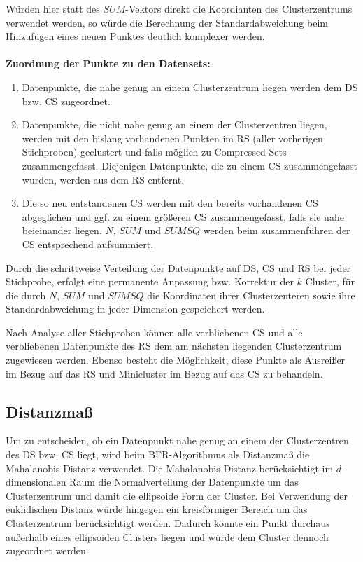 \documentclass[a4paper,12pt,twoside]{article}
\begin{document}
Würden hier statt des $ SUM $-Vektors direkt die Koordianten des Clusterzentrums verwendet werden, so würde die Berechnung der Standardabweichung beim Hinzufügen eines neuen Punktes deutlich komplexer werden.
\\
\\
\noindent
\textbf{Zuordnung der Punkte zu den Datensets:}
\begin{enumerate}
	\item Datenpunkte, die nahe genug an einem Clusterzentrum liegen werden dem DS bzw. CS zugeordnet.
	\item Datenpunkte, die nicht nahe genug an einem der Clusterzentren liegen, werden mit den bislang vorhandenen Punkten im RS (aller vorherigen Stichproben) geclustert und falls möglich zu Compressed Sets zusammengefasst. Diejenigen Datenpunkte, die zu einem CS zusammengefasst wurden, werden aus dem RS entfernt. 
	\item Die so neu entstandenen CS werden mit den bereits vorhandenen CS abgeglichen und ggf. zu einem größeren CS zusammengefasst, falls sie nahe beieinander liegen. $ N $, $ SUM $ und $ SUMSQ $ werden beim zusammenführen der CS entsprechend aufsummiert.
\end{enumerate}	
	
Durch die schrittweise Verteilung der Datenpunkte auf DS, CS und RS bei jeder Stichprobe, erfolgt eine permanente Anpassung bzw. Korrektur der $ k $ Cluster, für die durch $ N $, $ SUM $ und $ SUMSQ $ die Koordinaten ihrer Clusterzenteren sowie ihre Standardabweichung in jeder Dimension gespeichert werden.
\\
\par
Nach Analyse aller Stichproben können alle verbliebenen CS und alle verbliebenen Datenpunkte des RS dem am nächsten liegenden Clusterzentrum zugewiesen werden. 
Ebenso besteht die Möglichkeit, diese Punkte als Ausreißer im Bezug auf das RS und Minicluster im Bezug auf das CS zu behandeln.

\subsection{Distanzmaß} \label{Mahal}

Um zu entscheiden, ob ein Datenpunkt nahe genug an einem der Clusterzentren des DS bzw. CS liegt, wird beim BFR-Algorithmus als Distanzmaß die Mahalanobis-Distanz verwendet. Die Mahalanobis-Distanz berücksichtigt im $ d $-dimensionalen Raum die Normalverteilung der Datenpunkte um das Clusterzentrum und damit die ellipsoide Form der Cluster. Bei Verwendung der euklidischen Distanz würde hingegen ein kreisförmiger Bereich um das Clusterzentrum berücksichtigt werden. Dadurch könnte ein Punkt durchaus außerhalb eines ellipsoiden Clusters liegen und würde dem Cluster dennoch zugeordnet werden. 
\\
\end{document}

